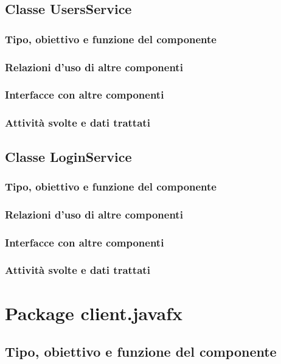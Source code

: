 \subsection{Classe UsersService}
\subsubsection*{Tipo, obiettivo e funzione del componente}
\subsubsection*{Relazioni d'uso di altre componenti}
\subsubsection*{Interfacce con altre componenti}
\subsubsection*{Attivit\`a svolte e dati trattati}

\subsection{Classe LoginService}
\subsubsection*{Tipo, obiettivo e funzione del componente}
\subsubsection*{Relazioni d'uso di altre componenti}
\subsubsection*{Interfacce con altre componenti}
\subsubsection*{Attivit\`a svolte e dati trattati}

\section{Package client.javafx} %
\subsection*{Tipo, obiettivo e funzione del componente}
